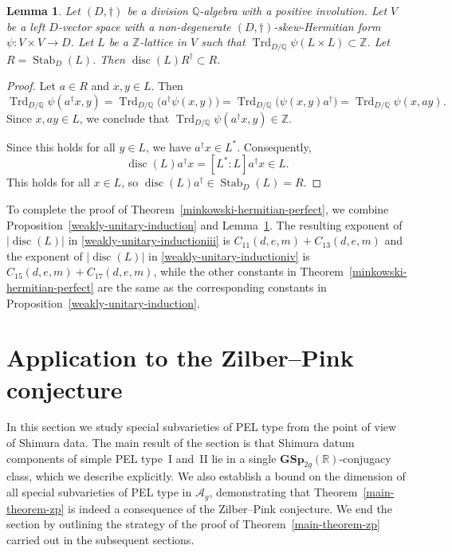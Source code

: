 \documentclass[JEP,XML,SOM,Unicode,NoFloatCountersInSection]{cedram}
\newcommand{\bQ}{\mathbb{Q}}
\newcommand{\bR}{\mathbb{R}}
\newcommand{\bZ}{\mathbb{Z}}
\newcommand{\Ag}{\mathcal{A}_g}
\newcommand{\gGSp}{\mathbf{GSp}}
\DeclareMathOperator{\disc}{disc}
\DeclareMathOperator{\Stab}{Stab}
\DeclareMathOperator{\Trd}{Trd}
\newcommand{\abs}[1]{\lvert #1 \rvert}
\newtheorem{lemma}{Lemma}[section]
\begin{document}
\begin{lemma} \label{R-cap-Rdag}
Let $(D,\dag)$ be a division $\bQ$-algebra with a positive involution.
Let $V$ be a left $D$-vector space with a non-degenerate $(D,\dag)$-skew-Hermitian form $\psi \colon V \times V \to D$.
Let $L$ be a $\bZ$-lattice in $V$ such that $\Trd_{D/\bQ} \psi(L \times L) \subset \bZ$.
Let $R = \Stab_D(L)$.
Then $\disc(L) R^\dag \subset R$.
\end{lemma}

\begin{proof}
Let $a \in R$ and $x, y \in L$.
Then
\[
\Trd_{D/\bQ} \psi(a^\dag x, y)
= \Trd_{D/\bQ} \bigl( a^\dag \psi(x,y) \bigr)
= \Trd_{D/\bQ} \bigl( \psi(x,y) a^\dag \bigr)
= \Trd_{D/\bQ} \psi(x,ay).
\]
Since $x, ay \in L$, we conclude that $\Trd_{D/\bQ} \psi(a^\dag x, y) \in \bZ$.

Since this holds for all $y \in L$, we have $a^\dag x \in L^*$.
Consequently,
\[
\disc(L)a^\dag x = [L^*:L]a^\dag x \in L.
\]
This holds for all $x \in L$, so $\disc(L)a^\dag \in \Stab_D(L) = R$.
\end{proof}

To complete the proof of Theorem~\ref{minkowski-hermitian-perfect}, we combine Proposition~\ref{weakly-unitary-induction} and Lemma~\ref{R-cap-Rdag}. The resulting expo\-nent of $\abs{\disc(L)}$ in \eqref{weakly-unitary-inductioniii} is $C_{11}(d,e,m)+C_{13}(d,e,m)$ and the exponent of $\abs{\disc(L)}$ in \eqref{weakly-unitary-inductioniv} is $C_{15}(d,e,m)+C_{17}(d,e,m)$, while the other constants in Theorem~\ref{minkowski-hermitian-perfect} are the same as the corresponding constants in Proposition~\ref{weakly-unitary-induction}.

\section{Application to the Zilber--Pink conjecture} \label{sec:ZP-high-level}

In this section we study special subvarieties of PEL type from the point of view of Shimura data.
The main result of the section is that Shimura datum components of simple PEL type~I and~II lie in a single $\gGSp_{2g}(\bR)$-conjugacy class, which we describe explicitly. We also establish a bound on the dimension of all special subvarieties of PEL type in $\Ag$, demonstrating that Theorem~\ref{main-theorem-zp} is indeed a consequence of the Zilber--Pink conjecture. We end the section by outlining the strategy of the proof of Theorem~\ref{main-theorem-zp} carried out in the subsequent sections.
\end{document}
